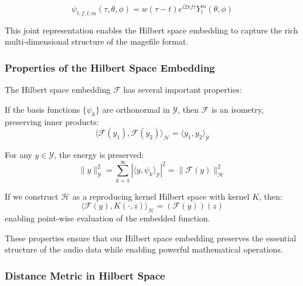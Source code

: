 \begin{equation}
\psi_{t,f,l,m}(\tau, \theta, \phi) = w(\tau-t) e^{i2\pi f \tau} Y_l^m(\theta, \phi)
\end{equation}

This joint representation enables the Hilbert space embedding to capture the rich multi-dimensional structure of the magefile format.

\subsubsection{Properties of the Hilbert Space Embedding}

The Hilbert space embedding $\mathcal{F}$ has several important properties:

\begin{proposition}
If the basis functions $\{\psi_k\}$ are orthonormal in $\mathcal{Y}$, then $\mathcal{F}$ is an isometry, preserving inner products:
\begin{equation}
\langle \mathcal{F}(y_1), \mathcal{F}(y_2) \rangle_{\mathcal{H}} = \langle y_1, y_2 \rangle_{\mathcal{Y}}
\end{equation}
\end{proposition}

\begin{proposition}
For any $y \in \mathcal{Y}$, the energy is preserved:
\begin{equation}
\|y\|_{\mathcal{Y}}^2 = \sum_{k=1}^{\infty} |\langle y, \psi_k \rangle_{\mathcal{Y}}|^2 = \|\mathcal{F}(y)\|_{\mathcal{H}}^2
\end{equation}
\end{proposition}

\begin{proposition}
If we construct $\mathcal{H}$ as a reproducing kernel Hilbert space with kernel $K$, then:
\begin{equation}
\langle \mathcal{F}(y), K(\cdot, z) \rangle_{\mathcal{H}} = (\mathcal{F}(y))(z)
\end{equation}
enabling point-wise evaluation of the embedded function.
\end{proposition}

These properties ensure that our Hilbert space embedding preserves the essential structure of the audio data while enabling powerful mathematical operations.

\subsubsection{Distance Metric in Hilbert Space}

